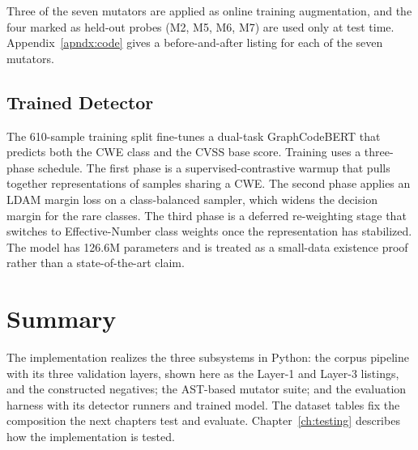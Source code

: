 Three of the seven mutators are applied as online training augmentation, and the
four marked as held-out probes (M2, M5, M6, M7) are used only at test time.
Appendix~\ref{apndx:code} gives a before-and-after listing for each of the seven
mutators.

\subsection{Trained Detector}

The 610-sample training split fine-tunes a dual-task GraphCodeBERT that predicts
both the CWE class and the CVSS base score. Training uses a three-phase schedule.
The first phase is a supervised-contrastive warmup that pulls together
representations of samples sharing a CWE. The second phase applies an LDAM margin
loss \cite{cao2019ldam} on a class-balanced sampler, which widens the decision
margin for the rare classes. The third phase is a deferred re-weighting stage
that switches to Effective-Number class weights \cite{cui2019cb} once the
representation has stabilized. The model
has 126.6M parameters and is treated as a small-data existence proof rather than
a state-of-the-art claim.

\section{Summary}

The implementation realizes the three subsystems in Python: the corpus pipeline
with its three validation layers, shown here as the Layer-1 and Layer-3 listings,
and the constructed negatives; the AST-based mutator suite; and the evaluation
harness with its detector runners and trained model. The dataset tables fix the
composition the next chapters test and evaluate. Chapter~\ref{ch:testing}
describes how the implementation is tested.
